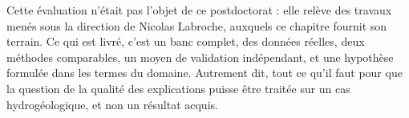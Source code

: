 Cette évaluation n'était pas l'objet de ce postdoctorat : elle relève des travaux menés sous la
direction de Nicolas Labroche, auxquels ce chapitre fournit son terrain. Ce qui est livré, c'est
un banc complet, des données réelles, deux méthodes comparables, un moyen de validation
indépendant, et une hypothèse formulée dans les termes du domaine. Autrement dit, tout ce qu'il
faut pour que la question de la qualité des explications puisse être traitée sur un cas
hydrogéologique, et non un résultat acquis.
